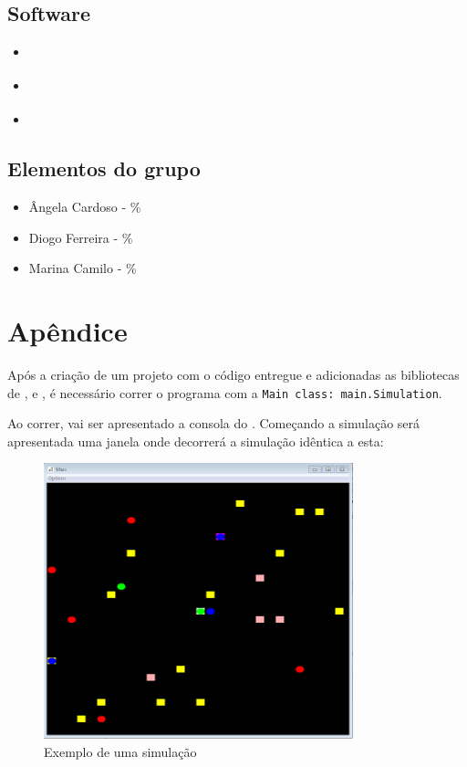 \documentclass[12pt]{report}
\begin{document}
\section{Software}

\begin{itemize}
	\item \href{http://jade.tilab.com}{\jade}
	\item \href{http://repast.sourceforge.net/repast_3/index.html}{\repast}
	\item \href{https://web.fe.up.pt/~hlc/doku.php?id=sajas}{\sajas}
\end{itemize}

\section{Elementos do grupo}
\begin{itemize}
	\item Ângela Cardoso - \%
	\item Diogo Ferreira - \%
	\item Marina Camilo - \%
\end{itemize}


\chapter{Apêndice}


Após a criação de um projeto \java com o código entregue e adicionadas as bibliotecas de \sajas, \jade e \repast, é necessário correr o programa com a \texttt{Main class: main.Simulation}.

Ao correr, vai ser apresentado a consola do \repast. Começando a simulação será apresentada uma janela onde decorrerá a simulação idêntica a esta:

\begin{figure}[h]
	\centering
	\includegraphics[width=0.8\textwidth]{simulacao}
	\caption{Exemplo de uma simulação}
	\label{simulacao}
\end{figure}
\end{document}
